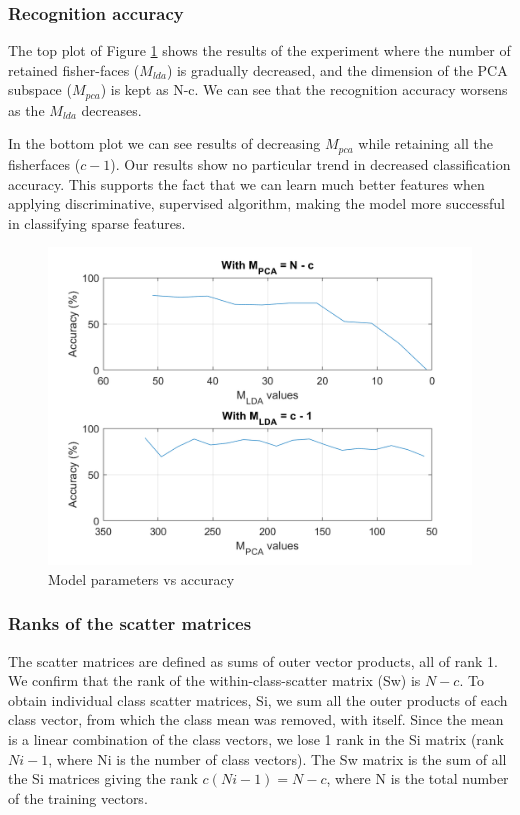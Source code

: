 \documentclass[10pt,technote]{IEEEtran}
\begin{document}
\subsubsection{Recognition accuracy}
The top plot of Figure \ref{fig:mod_params_vs_acc} shows the results of  the experiment where the number of retained fisher-faces ($M_{lda}$) is gradually decreased, and the dimension of the PCA subspace ($M_{pca}$) is kept as N-c. We can see that the recognition accuracy worsens as the $M_{lda}$ decreases.

In the bottom plot we can see results of decreasing $M_{pca}$ while retaining all the fisherfaces ($c-1$). Our results show no particular trend in decreased classification accuracy. This supports the fact that we can learn much better features when applying discriminative, supervised algorithm, making the model more successful in classifying sparse features.

\begin{figure}
    \centering
    \includegraphics[width = \linewidth]{../results/ex2LDA/accuracy_vs_Ms.png}
    \caption{Model parameters vs accuracy}
    \label{fig:mod_params_vs_acc}
\end{figure}

\subsubsection{Ranks of the scatter matrices}
The scatter matrices are defined as sums of outer vector products, all of rank 1.
We confirm that the rank of the within-class-scatter matrix (Sw) is $N - c$. To obtain individual class scatter matrices, Si, we sum all the outer products of each class vector, from which the class mean was removed, with itself. Since the mean is a linear combination of the class vectors, we lose 1 rank in the Si matrix (rank $Ni - 1$, where Ni is the number of class vectors). The Sw matrix is the sum of all the Si matrices giving the rank $c(Ni - 1) = N - c$, where N is the total number of the training vectors.
\end{document}

